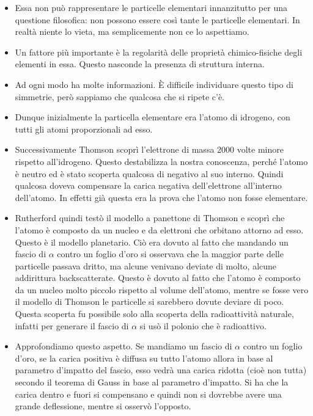 \begin{itemize}
    \item Essa non può rappresentare le particelle elementari innanzitutto per una questione filosofica: non possono essere così tante le particelle elementari. In realtà niente lo vieta, ma semplicemente non ce lo aspettiamo.
    \item Un fattore più importante è la regolarità delle proprietà chimico-fisiche degli elementi in essa. Questo nasconde la presenza di struttura interna.
    \item Ad ogni modo ha molte informazioni. È difficile individuare questo tipo di simmetrie, però sappiamo che qualcosa che si ripete c'è.
    \item Dunque inizialmente la particella elementare era l'atomo di idrogeno, con tutti gli atomi proporzionali ad esso.
    \item Successivamente Thomson scoprì l'elettrone di massa 2000 volte minore rispetto all'idrogeno. Questo destabilizza la nostra conoscenza, perché l'atomo è neutro ed è stato scoperta qualcosa di negativo al suo interno. Quindi qualcosa doveva compensare la carica negativa dell'elettrone all'interno dell'atomo. In effetti già questa era la prova che l'atomo non fosse elementare.
    \item Rutherford quindi testò il modello a panettone di Thomson e scoprì che l'atomo è composto da un nucleo e da elettroni che orbitano attorno ad esso. Questo è il modello planetario. Ciò era dovuto al fatto che mandando un fascio di $\alpha$ contro un foglio d'oro si osservava che la maggior parte delle particelle passava dritto, ma alcune venivano deviate di molto, alcune addirittura backscatterate. Questo è dovuto al fatto che l'atomo è composto da un nucleo molto piccolo rispetto al volume dell'atomo, mentre se fosse vero il modello di Thomson le particelle si sarebbero dovute deviare di poco. Questa scoperta fu possibile solo alla scoperta della radioattività naturale, infatti per generare il fascio di $\alpha$ si usò il polonio che è radioattivo.
    \item Approfondiamo questo aspetto. Se mandiamo un fascio di $\alpha$ contro un foglio d'oro, se la carica positiva è diffusa su tutto l'atomo allora in base al parametro d'impatto del fascio, esso vedrà una carica ridotta (cioè non tutta) secondo il teorema di Gauss in base al parametro d'impatto. Si ha che la carica dentro e fuori si compensano e quindi non si dovrebbe avere una grande deflessione, mentre si osservò l'opposto.
\end{itemize}

